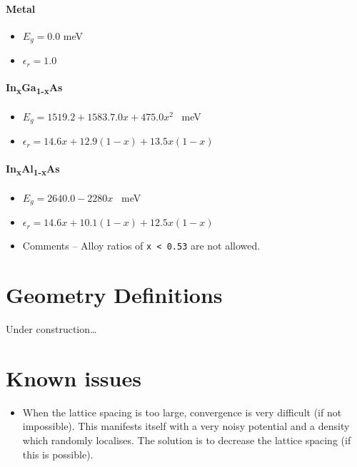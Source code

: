 \documentclass[12pt]{article}
\newcommand{\dealii}{\texttt{deal.II}}
\newcommand{\commentout}[1]{}
\begin{document}
\paragraph{Metal}
\begin{itemize}
    \item{$E_g = 0.0$ meV}
    \item{$\epsilon_r = 1.0$}
\end{itemize}

\paragraph{In\textsubscript{x}Ga\textsubscript{1-x}As}
\begin{itemize}
    \item{$E_g = 1519.2 + 1583.7.0 x + 475.0 x^2$ \ meV}
    \item{$\epsilon_r = 14.6 x + 12.9 (1-x) + 13.5 x (1-x)$}
\end{itemize}

\paragraph{In\textsubscript{x}Al\textsubscript{1-x}As}
\begin{itemize}
    \item{$E_g = 2640.0 - 2280x$ \ meV}
    \item{$\epsilon_r = 14.6 x + 10.1 (1-x) + 12.5 x (1-x)$}
    \item Comments -- Alloy ratios of \texttt{x < 0.53} are not allowed.
\end{itemize}

\section{Geometry Definitions}
\label{app:GeometryDefinitions}

Under construction\ldots

\section{Known issues}
\begin{itemize}
\commentout{
    \item The \dealii{} solver for the Newton iteration step can stop without warning
    when solving the finite element matrix equation.  This error manifests itself when
    \dealii{} does not create a \texttt{x.dat}.   The exception (which comes from
    \dealii{}) says \texttt{Unknown exception!\textbackslash nAborting!}, followed by a stack
    trace.  Sometimes this can be solved by decreasing the accuracy of the matrix
    solver in \dealii{}.  This is done by changing the second argument of the \texttt{SolverControl}
    class in the \texttt{NewtonProblem<dim>::solve~()} method.  Another possible solution is
    to change the lattice spacing on which the density is calculated.
}
    \item When the lattice spacing is too large, convergence is very difficult (if not impossible).
    This manifests itself with a very noisy potential and a density which randomly localises.
    The solution is to decrease the lattice spacing (if this is possible).
\end{itemize}
\end{document}
